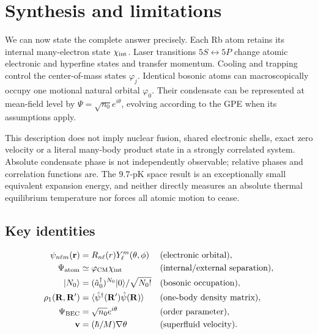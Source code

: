 \documentclass[11pt,a4paper]{article}
\newcommand{\ph}{\varphi}
\begin{document}
\section{Synthesis and limitations}
We can now state the complete answer precisely. Each Rb atom retains its internal many-electron state $\chi_{\rm int}$. Laser transitions $5S\leftrightarrow5P$ change atomic electronic and hyperfine states and transfer momentum. Cooling and trapping control the center-of-mass states $\ph_j$. Identical bosonic atoms can macroscopically occupy one motional natural orbital $\ph_0$. Their condensate can be represented at mean-field level by $\Psi=\sqrt{n_0}e^{i\theta}$, evolving according to the GPE when its assumptions apply.

This description does not imply nuclear fusion, shared electronic shells, exact zero velocity or a literal many-body product state in a strongly correlated system. Absolute condensate phase is not independently observable; relative phases and correlation functions are. The $9.7$-pK space result is an exceptionally small equivalent expansion energy, and neither directly measures an absolute thermal equilibrium temperature nor forces all atomic motion to cease.

\subsection*{Key identities}
\begin{align*}
\psi_{n\ell m}(\mathbf r)&=R_{n\ell}(r)Y_\ell^m(\theta,\phi) &&\text{(electronic orbital)},\\
\Psi_{\rm atom}&\simeq\ph_{\rm CM}\chi_{\rm int}&&\text{(internal/external separation)},\\
|N_0\rangle&=(\hat a_0^\dagger)^{N_0}|0\rangle/\sqrt{N_0!}&&\text{(bosonic occupation)},\\
\rho_1(\mathbf R,\mathbf R')&=\langle\hat\psi^\dagger(\mathbf R')\hat\psi(\mathbf R)\rangle&&\text{(one-body density matrix)},\\
\Psi_{\rm BEC}&=\sqrt{n_0}e^{i\theta}&&\text{(order parameter)},\\
\mathbf v&=(\hbar/M)\nabla\theta&&\text{(superfluid velocity)}.
\end{align*}
\end{document}
